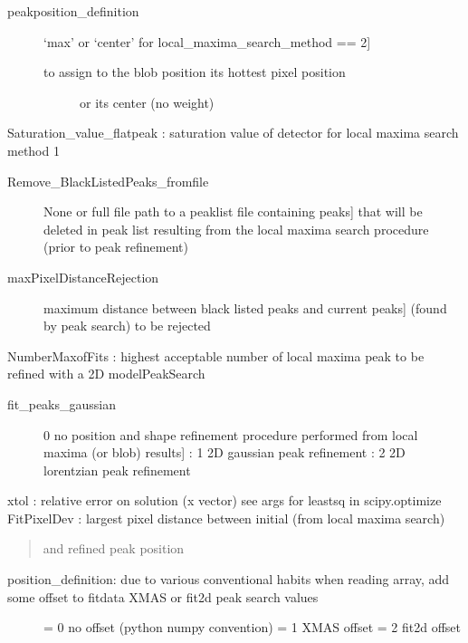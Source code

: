 \documentclass[letterpaper,10pt,english]{sphinxmanual}
\begin{document}
\begin{fulllineitems}
\begin{description}
\begin{description}
\end{description}

\item[{peakposition\_definition}] \leavevmode{[}‘max’ or ‘center’  for local\_maxima\_search\_method == 2{]}\begin{description}
\item[{to assign to the blob position its hottest pixel position}] \leavevmode
or its center (no weight)

\end{description}

\end{description}

Saturation\_value\_flatpeak        :  saturation value of detector for local maxima search method 1
\begin{description}
\item[{Remove\_BlackListedPeaks\_fromfile}] \leavevmode{[}None or full file path to a peaklist file containing peaks{]}
that will be deleted in peak list resulting from
the local maxima search procedure (prior to peak refinement)

\item[{maxPixelDistanceRejection}] \leavevmode{[}maximum distance between black listed peaks and current peaks{]}
(found by peak search) to be rejected

\end{description}

NumberMaxofFits            : highest acceptable number of local maxima peak to be refined with a 2D modelPeakSearch
\begin{description}
\item[{fit\_peaks\_gaussian}] \leavevmode{[}0  no position and shape refinement procedure performed from local maxima (or blob) results{]}
:    1  2D gaussian peak refinement
:    2  2D lorentzian peak refinement

\end{description}

xtol  : relative error on solution (x vector)  see args for leastsq in scipy.optimize
FitPixelDev            :  largest pixel distance between initial (from local maxima search)
\begin{quote}

and refined peak position
\end{quote}
\begin{description}
\item[{position\_definition: due to various conventional habits when reading array, add some offset to fitdata XMAS or fit2d peak search values}] \leavevmode
= 0    no offset (python numpy convention)
= 1   XMAS offset
= 2   fit2d offset


\end{description}
\end{fulllineitems}
\end{document}
